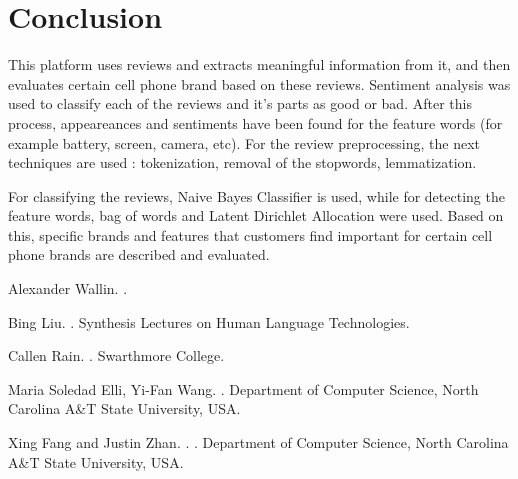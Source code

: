 \documentclass[11pt]{article}
\begin{document}
\section{Conclusion}
This platform uses reviews and extracts meaningful information from it, and then evaluates certain cell phone brand based on these reviews. Sentiment analysis was used to classify each of the reviews and it's parts as good or bad. After this process, appeareances and sentiments have been found for the feature words (for example battery, screen, camera, etc). For the review preprocessing, the next techniques are used : tokenization, removal of the stopwords, lemmatization. \par

For classifying the reviews, Naive Bayes Classifier is used, while for detecting the feature words, bag of words and Latent Dirichlet Allocation were used. Based on this, specific brands and features that customers find important for certain cell phone brands are described and evaluated.  

\begin{thebibliography}{}

Alexander Wallin.
.


Bing Liu.
.
\newblock Synthesis Lectures on Human Language Technologies.


Callen Rain.
.
\newblock Swarthmore College.


Maria Soledad Elli, Yi-Fan Wang.
.
\newblock Department of Computer Science, North Carolina A\&T State University, USA.


Xing Fang and Justin Zhan.
.
.
\newblock Department of Computer Science, North Carolina A\&T State University, USA.



\end{thebibliography}
\end{document}
